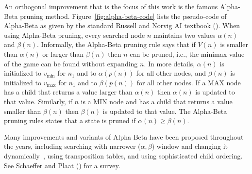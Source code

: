 \documentclass[runningheads]{llncs}
\newcommand{\MM}{\mathit{V}}
\newcommand{\vmax}{v_{\text{max}}}
\newcommand{\vmin}{v_{\text{min}}}
\newcommand{\rootnode}{\mathit{n_1}}
\begin{document}
An orthogonal improvement that is the focus of this work is the famous Alpha-Beta pruning method. 
Figure~\ref{fig:alpha-beta-code} lists the pseudo-code of Alpha-Beta as given by the standard Russell and Norvig AI textbook (\citeyear{russell2016artificial}). 
When using Alpha-Beta pruning, every searched node $n$ maintains two values $\alpha(n)$ and $\beta(n)$. 
Informally, the Alpha-Beta pruning rule says that if $\MM(n)$ is smaller than $\alpha(n)$ or larger than $\beta(n)$ then $n$ can be pruned, i.e., the minimax value of the game can be found without expanding $n$. In more details,  
$\alpha(n)$ is initialized to $\vmin$ for $\rootnode{}$ and to $\alpha(p(n))$ for all other nodes, and $\beta(n)$ is initialized to $\vmax$ for $\rootnode{}$ and to $\beta(p(n))$ for all other nodes. If a MAX node has a child that returns a value larger than $\alpha(n)$ then $\alpha(n)$ is updated to that value. Similarly, if $n$ is a MIN node and has a child that returns a value smaller than $\beta(n)$ then $\beta(n)$ is updated to that value. The Alpha-Beta pruning rules states that a state is pruned if $\alpha(n)\geq \beta(n)$.


Many improvements and variants of Alpha Beta have been proposed throughout the years, including searching with narrower ($\alpha, \beta$) window and changing it dynamically~\citep{pearl1980scout,reinefeld1983improvement}, using transposition tables, and using sophisticated child ordering. See
Schaeffer and Plaat (\citeyear{schaeffer1996new}) for a survey. 




\end{document}
